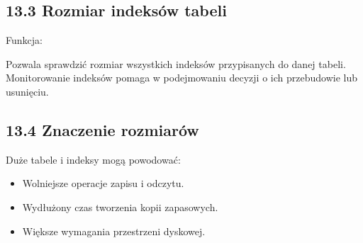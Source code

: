 \documentclass[a4paper,11pt,polish]{sphinxmanual}
\begin{document}
\begin{sphinxVerbatim}[commandchars=\\\{\}]
    
    
 
   
\end{sphinxVerbatim}


\subsection{13.3 Rozmiar indeksów tabeli}
\label{\detokenize{Konfiguracja_baz_danych/Konfiguracja_baz_danych:rozmiar-indeksow-tabeli}}
\sphinxAtStartPar
Funkcja:

\begin{sphinxVerbatim}[commandchars=\\\{\}]
\end{sphinxVerbatim}

\sphinxAtStartPar
Pozwala sprawdzić rozmiar wszystkich indeksów przypisanych do danej tabeli. Monitorowanie indeksów pomaga w podejmowaniu decyzji o ich przebudowie lub usunięciu.


\subsection{13.4 Znaczenie rozmiarów}
\label{\detokenize{Konfiguracja_baz_danych/Konfiguracja_baz_danych:znaczenie-rozmiarow}}
\sphinxAtStartPar
Duże tabele i indeksy mogą powodować:
\begin{itemize}
\item {} 
\sphinxAtStartPar
Wolniejsze operacje zapisu i odczytu.

\item {} 
\sphinxAtStartPar
Wydłużony czas tworzenia kopii zapasowych.

\item {} 
\sphinxAtStartPar
Większe wymagania przestrzeni dyskowej.

\end{itemize}
\end{document}
